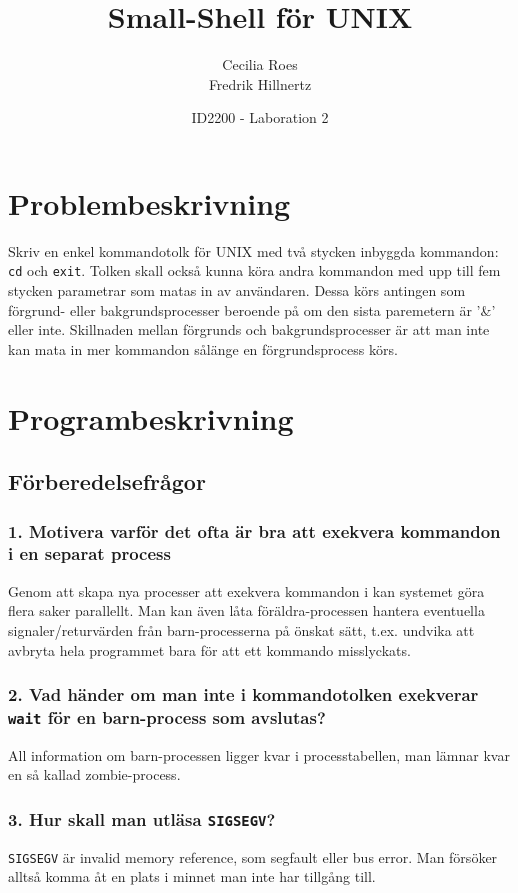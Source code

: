 \documentclass[a4paper]{article}
\title{Small-Shell för UNIX}
\date{ID2200 - Laboration 2}
\author{Cecilia Roes \\ Fredrik Hillnertz}
\begin{document}

\maketitle

\section*{Problembeskrivning}
Skriv en enkel kommandotolk för UNIX med två stycken inbyggda kommandon: \texttt{cd} och \texttt{exit}. Tolken skall också kunna köra andra kommandon med upp till fem stycken parametrar som matas in av användaren. Dessa körs antingen som förgrund- eller bakgrundsprocesser beroende på om den sista paremetern är '&' eller inte. Skillnaden mellan förgrunds och bakgrundsprocesser är att man inte kan mata in mer kommandon sålänge en förgrundsprocess körs. 

\section*{Programbeskrivning}

\subsection*{Förberedelsefrågor}
\subsubsection*{1. Motivera varför det ofta är bra att exekvera kommandon i en separat process}
Genom att skapa nya processer att exekvera kommandon i kan systemet göra flera saker parallellt. Man kan även låta föräldra-processen hantera eventuella signaler/returvärden från barn-processerna på önskat sätt, t.ex. undvika att avbryta hela programmet bara för att ett kommando misslyckats.

\subsubsection*{2. Vad händer om man inte i kommandotolken exekverar \texttt{wait} för en barn-process som avslutas?}
All information om barn-processen ligger kvar i processtabellen, man lämnar kvar en så kallad zombie-process.

\subsubsection*{3. Hur skall man utläsa \texttt{SIGSEGV}?}
\texttt{SIGSEGV} är invalid memory reference, som segfault eller bus error. Man försöker alltså komma åt en plats i minnet man inte har tillgång till.
\end{document}
